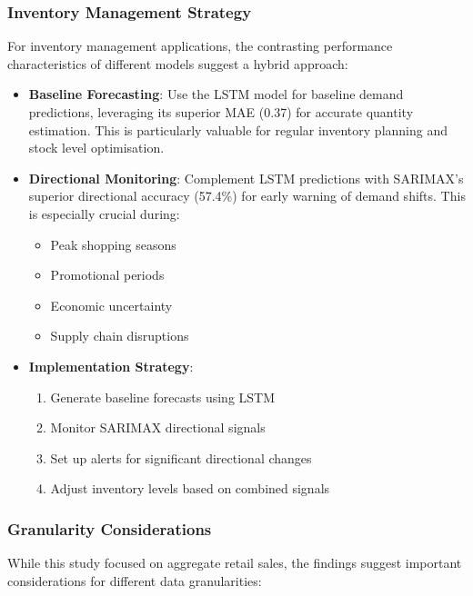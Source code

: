 \documentclass[12pt,a4paper]{report}
\begin{document}
\subsubsection{Inventory Management Strategy}
For inventory management applications, the contrasting performance characteristics of different models suggest a hybrid approach:

\begin{itemize}
    \item \textbf{Baseline Forecasting}: Use the LSTM model for baseline demand predictions, leveraging its superior MAE (0.37) for accurate quantity estimation. This is particularly valuable for regular inventory planning and stock level optimisation.
    
    \item \textbf{Directional Monitoring}: Complement LSTM predictions with SARIMAX's superior directional accuracy (57.4\%) for early warning of demand shifts. This is especially crucial during:
    \begin{itemize}
        \item Peak shopping seasons
        \item Promotional periods
        \item Economic uncertainty
        \item Supply chain disruptions
    \end{itemize}
    
    \item \textbf{Implementation Strategy}:
    \begin{enumerate}
        \item Generate baseline forecasts using LSTM
        \item Monitor SARIMAX directional signals
        \item Set up alerts for significant directional changes
        \item Adjust inventory levels based on combined signals
    \end{enumerate}
\end{itemize}

\subsubsection{Granularity Considerations}
While this study focused on aggregate retail sales, the findings suggest important considerations for different data granularities:
\end{document}
